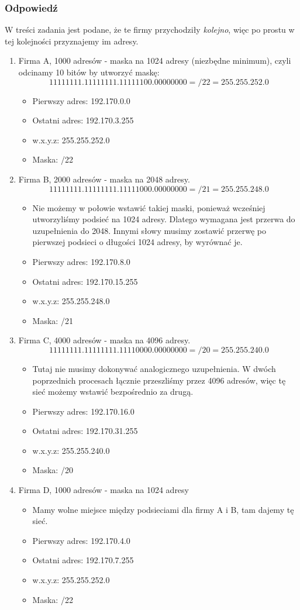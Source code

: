 		\subsubsection{Odpowiedź}
			W treści zadania jest podane, że te firmy przychodziły \textit{kolejno}, więc po prostu w tej kolejności przyznajemy im adresy.
			\begin{enumerate}
				\item Firma A, 1000 adresów - maska na 1024 adresy (niezbędne minimum), czyli odcinamy 10 bitów by utworzyć maskę:
				$$ 11111111.11111111.11111100.00000000=/22=255.255.252.0$$
				\begin{itemize}
					\item Pierwszy adres: 192.170.0.0
					\item Ostatni adres: 192.170.3.255
					\item w.x.y.z: 255.255.252.0
					\item Maska: /22
				\end{itemize}
				\item Firma B, 2000 adresów - maska na 2048 adresy.
				$$ 11111111.11111111.11111000.00000000=/21=255.255.248.0$$
				\begin{itemize}
					\item Nie możemy w połowie wstawić takiej maski, ponieważ wcześniej utworzyliśmy podsieć na 1024 adresy. Dlatego wymagana jest przerwa do uzupełnienia do 2048. Innymi słowy musimy zostawić przerwę po pierwszej podsieci o długości 1024 adresy, by wyrównać je.
					\item Pierwszy adres: 192.170.8.0
					\item Ostatni adres: 192.170.15.255
					\item w.x.y.z: 255.255.248.0
					\item Maska: /21
				\end{itemize}
				\item Firma C, 4000 adresów - maska na 4096 adresy.
				$$ 11111111.11111111.11110000.00000000=/20=255.255.240.0$$
				\begin{itemize}
					\item Tutaj nie musimy dokonywać analogicznego uzupełnienia. W dwóch poprzednich procesach łącznie przeszliśmy przez 4096 adresów, więc tę sieć możemy wstawić bezpośrednio za drugą.
					\item Pierwszy adres: 192.170.16.0
					\item Ostatni adres: 192.170.31.255
					\item w.x.y.z: 255.255.240.0
					\item Maska: /20
				\end{itemize}
				\item Firma D, 1000 adresów - maska na 1024 adresy
				\begin{itemize}
					\item Mamy wolne miejsce między podsieciami dla firmy A i B, tam dajemy tę sieć.
					\item Pierwszy adres: 192.170.4.0
					\item Ostatni adres: 192.170.7.255
					\item w.x.y.z: 255.255.252.0
					\item Maska: /22
				\end{itemize}
			\end{enumerate}
